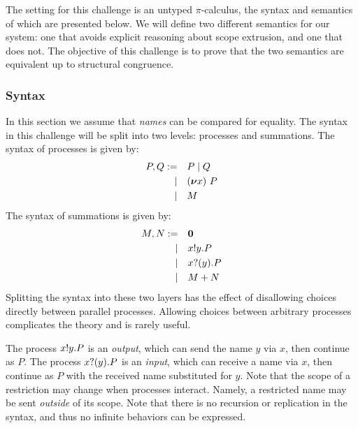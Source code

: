 The setting for this challenge is an untyped \( \pi \)-calculus, the syntax and semantics of which are presented below.
We will define two different semantics for our system: one that avoids explicit reasoning about scope extrusion, and one that does not.
The objective of this challenge is to prove that the two semantics are equivalent up to structural congruence.

\subsubsection{Syntax}
In this section we assume that \emph{names}  can be compared for equality.
The syntax in this challenge will be split into two levels: processes and summations.
The syntax of processes is given by:
\begin{align*}
  P,Q :=&&& P \mid Q \\
  |&&& (\bm{\nu} x)~P \\
  |&&& M
\end{align*}
The syntax of summations is given by:
\begin{align*}
  M,N :=&&& \bm{0} \\
  |&&& x ! y . P \\
  |&&& x ? (y) . P \\
  |&&& M + N
\end{align*}
Splitting the syntax into these two layers has the effect of disallowing choices directly between parallel processes.
Allowing choices between arbitrary processes complicates the theory and is rarely useful.

The process \( x ! y . P \) is an \emph{output}, which can send the name \( y \) via \( x \), then continue as \( P \).
The process \( x ? (y) . P \) is an \emph{input}, which can receive a name via \( x \), then continue as \( P \) with the received name substituted for \( y \).
Note that the scope of a restriction may change when processes interact. Namely, a restricted name may be sent \emph{outside} of its scope.
Note that there is no recursion or replication in the syntax, and thus no infinite behaviors can be expressed.

